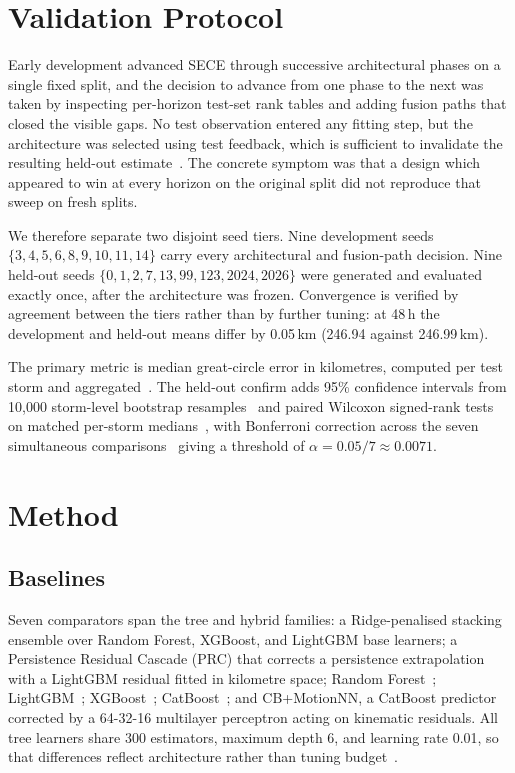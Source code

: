 \documentclass[conference]{IEEEtran}
\newcommand{\sece}{SECE}
\begin{document}
\section{Validation Protocol}
Early development advanced \sece{} through successive architectural phases on a
single fixed split, and the decision to advance from one phase to the next was
taken by inspecting per-horizon test-set rank tables and adding fusion paths that
closed the visible gaps. No test observation entered any fitting step, but the
architecture was selected using test feedback, which is sufficient to invalidate
the resulting held-out estimate~\cite{cawley2010}. The
concrete symptom was that a design which appeared to win at every horizon on the
original split did not reproduce that sweep on fresh splits.

We therefore separate two disjoint seed tiers. Nine development seeds
$\{3,4,5,6,8,9,10,11,14\}$ carry every architectural and fusion-path decision.
Nine held-out seeds $\{0,1,2,7,13,99,123,2024,2026\}$ were generated and
evaluated exactly once, after the architecture was frozen. Convergence is
verified by agreement between the tiers rather than by further tuning: at 48\,h
the development and held-out means differ by 0.05\,km (246.94 against
246.99\,km).

The primary metric is median great-circle error in kilometres, computed per test
storm and aggregated~\cite{sinnott1984}. The held-out confirm
adds 95\% confidence intervals from 10{,}000 storm-level bootstrap
resamples~\cite{efron1979} and paired Wilcoxon signed-rank
tests on matched per-storm medians~\cite{wilcoxon1945}, with
Bonferroni correction across the seven simultaneous
comparisons~\cite{bonferroni1936} giving a threshold of
$\alpha = 0.05/7 \approx 0.0071$.

\section{Method}
\subsection{Baselines}
Seven comparators span the tree and hybrid families: a Ridge-penalised stacking
ensemble over Random Forest, XGBoost, and LightGBM base learners; a Persistence
Residual Cascade (PRC) that corrects a persistence extrapolation with a LightGBM
residual fitted in kilometre space; Random Forest~\cite{breiman2001rf};
LightGBM~\cite{ke2017lightgbm}; XGBoost~\cite{chen2016xgboost};
CatBoost~\cite{prokhorenkova2018catboost}; and CB+MotionNN, a CatBoost predictor
corrected by a 64-32-16 multilayer perceptron acting on kinematic residuals. All
tree learners share 300 estimators, maximum depth 6, and learning rate 0.01, so
that differences reflect architecture rather than tuning
budget~\cite{grinsztajn2022tree}.
\end{document}
